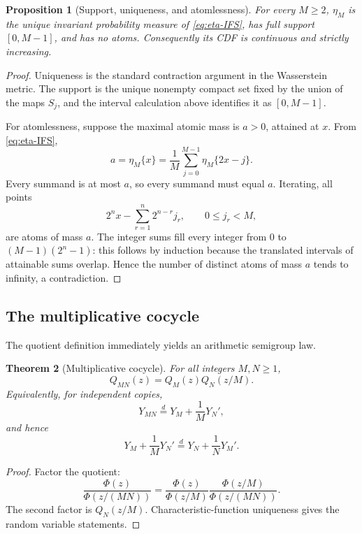 \documentclass[11pt,oneside]{article}
\newtheorem{theorem}{Theorem}[section]
\newtheorem{proposition}[theorem]{Proposition}
\theoremstyle{definition}
\theoremstyle{remark}
\numberwithin{equation}{section}
\newcommand{\1}{\mathbf 1}
\begin{document}
\begin{proposition}[Support, uniqueness, and atomlessness]
\label{prop:support-atomless}
For every $M\ge2$, $\eta_M$ is the unique invariant probability measure of
\eqref{eq:eta-IFS}, has full support $[0,M-1]$, and has no atoms.  Consequently its CDF
is continuous and strictly increasing.
\end{proposition}

\begin{proof}
Uniqueness is the standard contraction argument in the Wasserstein metric.  The support is
the unique nonempty compact set fixed by the union of the maps $S_j$, and the interval
calculation above identifies it as $[0,M-1]$.

For atomlessness, suppose the maximal atomic mass is $a>0$, attained at $x$.  From
\eqref{eq:eta-IFS},
\[
 a=\eta_M\{x\}=\frac1M\sum_{j=0}^{M-1}\eta_M\{2x-j\}.
\]
Every summand is at most $a$, so every summand must equal $a$.  Iterating, all points
\[
 2^n x-\sum_{r=1}^{n}2^{n-r}j_r,
 \qquad 0\le j_r<M,
\]
are atoms of mass $a$.  The integer sums fill every integer from $0$ to
$(M-1)(2^n-1)$: this follows by induction because the translated intervals of attainable
sums overlap.  Hence the number of distinct atoms of mass $a$ tends to infinity, a
contradiction.
\end{proof}

\subsection{The multiplicative cocycle}

The quotient definition immediately yields an arithmetic semigroup law.

\begin{theorem}[Multiplicative cocycle]
\label{thm:cocycle}
For all integers $M,N\ge1$,
\begin{equation}
 Q_{MN}(z)=Q_M(z)Q_N(z/M).
 \label{eq:QM-cocycle}
\end{equation}
Equivalently, for independent copies,
\begin{equation}
 Y_{MN}\overset d=Y_M+\frac1M Y_N',
 \label{eq:Y-cocycle}
\end{equation}
and hence
\begin{equation}
 Y_M+\frac1M Y_N'
 \overset d=
 Y_N+\frac1N Y_M'.
 \label{eq:cocycle-commutation}
\end{equation}
\end{theorem}

\begin{proof}
Factor the quotient:
\[
 \frac{\Phi(z)}{\Phi(z/(MN))}
 =\frac{\Phi(z)}{\Phi(z/M)}
  \frac{\Phi(z/M)}{\Phi(z/(MN))}.
\]
The second factor is $Q_N(z/M)$.  Characteristic-function uniqueness gives the random
variable statements.
\end{proof}
\end{document}
